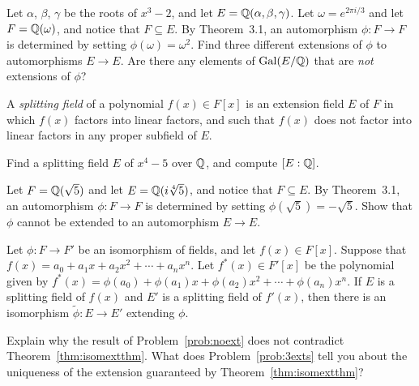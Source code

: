 \begin{problem}\label{prob:3exts}
    Let $\alpha$, $\beta$, $\gamma$ be the roots of $x^3-2$, and let $E = \mathbb{Q}(\alpha,\beta,\gamma)$. Let $\omega = e^{2\pi i/3}$ and let $F=\mathbb{Q}(\omega)$, and notice that $F\subseteq E$. By Theorem~3.1, an automorphism $\phi:F\longrightarrow F$ is determined by setting $\phi(\omega)=\omega^2$. Find three different extensions of $\phi$ to automorphisms $E\longrightarrow E$. Are there any elements of $\operatorname{Gal}(E/\mathbb{Q})$ that are \textit{not} extensions of $\phi$?
\end{problem}



\begin{definition}
    A \textit{splitting field} of a polynomial $f(x)\in F[x]$ is an extension field $E$ of $F$ in which $f(x)$ factors into linear factors, and such that $f(x)$ does not factor into linear factors in any proper subfield of $E$.
\end{definition}

\begin{problem}
Find a splitting field $E$ of $x^4-5$ over $\mathbb{Q}$, and compute $[E:\mathbb{Q}]$.
\end{problem}



\begin{problem}\label{prob:noext}
    Let $F = \mathbb{Q}(\sqrt{5})$ and let $E = \mathbb{Q}(i\sqrt[4]{5})$, and notice that $F\subseteq E$. By Theorem~3.1, an automorphism $\phi:F\longrightarrow F$ is determined by setting $\phi(\sqrt{5})=-\sqrt{5}$. Show that $\phi$ cannot be extended to an automorphism $E\longrightarrow E$.
\end{problem}



\begin{theorem}
    Let $\phi:F\longrightarrow F'$ be an isomorphism of fields, and let $f(x)\in F[x]$. Suppose that $f(x)=a_0 + a_1x + a_2x^2 + \cdots + a_nx^n$. Let $f^*(x)\in F'[x]$ be the polynomial given by $f^*(x)=\phi(a_0) + \phi(a_1)x + \phi(a_2)x^2 + \cdots + \phi(a_n)x^n$. If $E$ is a splitting field of $f(x)$ and $E'$ is a splitting field of $f'(x)$, then there is an isomorphism $\tilde{\phi}:E \longrightarrow E'$ extending $\phi$.
    \label{thm:isomextthm}
\end{theorem}

\begin{problem}
    Explain why the result of Problem~\ref{prob:noext} does not contradict Theorem~\ref{thm:isomextthm}. What does Problem~\ref{prob:3exts} tell you about the uniqueness of the extension guaranteed by Theorem~\ref{thm:isomextthm}?
\end{problem}



